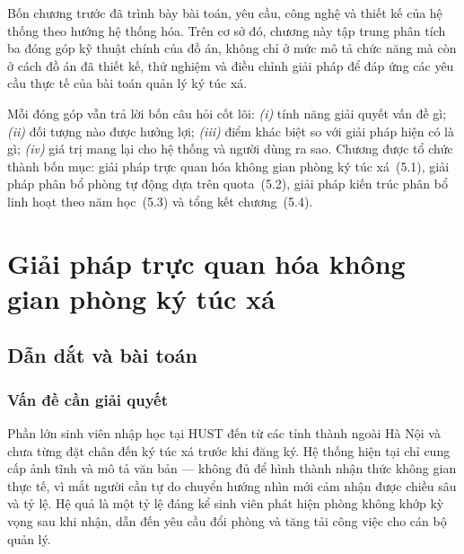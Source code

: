 \documentclass[../DoAn.tex]{subfiles}
\begin{document}
\sloppy

\SetAlgoNoLine  %
\SetAlgoSkip{}          %
\setlength{\algomargin}{1em}  %

Bốn chương trước đã trình bày bài toán, yêu cầu, công nghệ và thiết kế của hệ
thống theo hướng hệ thống hóa. Trên cơ sở đó, chương này tập trung phân tích
ba đóng góp kỹ thuật chính của đồ án, không chỉ ở mức mô tả chức năng mà còn ở
cách đồ án đã thiết kế, thử nghiệm và điều chỉnh giải pháp để đáp ứng các yêu
cầu thực tế của bài toán quản lý ký túc xá.

Mỗi đóng góp vẫn trả lời bốn câu hỏi cốt lõi: \textit{(i)} tính năng giải
quyết vấn đề gì; \textit{(ii)} đối tượng nào được hưởng lợi; \textit{(iii)}
điểm khác biệt so với giải pháp hiện có là gì; \textit{(iv)} giá trị mang lại
cho hệ thống và người dùng ra sao. Chương được tổ chức thành bốn mục: giải
pháp trực quan hóa không gian phòng ký túc xá~(5.1), giải pháp phân bổ phòng
tự động dựa trên quota~(5.2), giải pháp kiến trúc phân bổ linh hoạt theo năm
học~(5.3) và tổng kết chương~(5.4).

\section{Giải pháp trực quan hóa không gian phòng ký túc xá}
\label{sec:contrib_visualization}

\subsection{Dẫn dắt và bài toán}
\label{subsec:viz_problem}

\subsubsection{Vấn đề cần giải quyết}

Phần lớn sinh viên nhập học tại HUST đến từ các tỉnh thành ngoài Hà Nội và
chưa từng đặt chân đến ký túc xá trước khi đăng ký. Hệ thống hiện tại chỉ
cung cấp ảnh tĩnh và mô tả văn bản --- không đủ để hình thành nhận thức không
gian thực tế, vì mắt người cần tự do chuyển hướng nhìn mới cảm nhận được
chiều sâu và tỷ lệ. Hệ quả là một tỷ lệ đáng kể sinh viên phát hiện phòng
không khớp kỳ vọng sau khi nhận, dẫn đến yêu cầu đổi phòng và tăng tải công
việc cho cán bộ quản lý.
\end{document}
